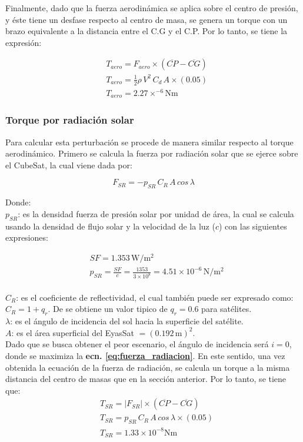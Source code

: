 Finalmente, dado que la fuerza aerodinámica se aplica sobre el centro de presión, y éste tiene un desfase respecto al centro de masa, se genera un torque con un brazo equivalente a la distancia entre el C.G y el C.P. Por lo tanto, se tiene la expresión:

$$
\begin{aligned}
		& T_{aero} = F_{aero}\times\left(\overline{CP} - \overline{CG}\right)\\
		& T_{aero} = \frac{1}{2}\rho\,V^2\,C_{d}\,A\times\left(0.05\right) \\
		& T_{aero} =2.27\times^{-6} \mathrm{Nm}
\end{aligned}
$$		

 
\subsubsection{Torque por radiación solar}
\hfill \break
Para calcular esta perturbación se procede de manera similar respecto al torque aerodinámico. Primero se calcula la fuerza por radiación solar que se ejerce sobre el CubeSat, la cual viene dada por: 

\begin{equation}\label{eq:fuerza_radiacion}
	F_{SR} = -p_{SR}\,C_{R}\,A\,cos\,\lambda	
\end{equation}

\noindent Donde:\\
$p_{SR}$: es la densidad fuerza de presión solar por unidad de área, la cual se calcula usando la densidad de flujo solar y la velocidad de la luz ($c$) con las siguientes expresiones: 

$$
\begin{aligned}
	& SF = 1.353\,\mathrm{W/m^2}\\
	& p_{SR} = \frac{SF}{c} = \frac{1353}{3\times10^{8}}=4.51\times10^{-6}\,\mathrm{N/m^2}	
\end{aligned}
$$
\\
\noindent$C_{R}$: es el coeficiente de reflectividad, el cual también puede ser expresado como: $C_R = 1+q_r$. De \cite{mcclain2001fundamentals} se obtiene un valor tipico de $q_r =0.6$ para satélites.\\
$\lambda$: es el ángulo de incidencia del sol hacia la superficie del satélite.\\
$A$: es el área superficial del EyasSat $= \left(0.192\,\mathrm{m}\right)^2$.\\
Dado que se busca obtener el peor escenario, el ángulo de incidencia será $i=0$, donde se maximiza la \textbf{ecn. \eqref{eq:fuerza_radiacion}}. En este sentido, una vez obtenida la ecuación de la fuerza de radiación, se calcula un torque a la misma distancia del centro de masas que en la sección anterior. Por lo tanto, se tiene que: 
 $$
 \begin{aligned}
 	& T_{SR} = \lvert F_{SR}\rvert\times\left(\overline{CP} - \overline{CG}\right)\\
 	& T_{SR} = p_{SR}\,C_{R}\,A\,cos\,\lambda\times\left(0.05\right) \\
 	& T_{SR} =1.33\times10^{-8} \mathrm{Nm}
 \end{aligned}
 $$
